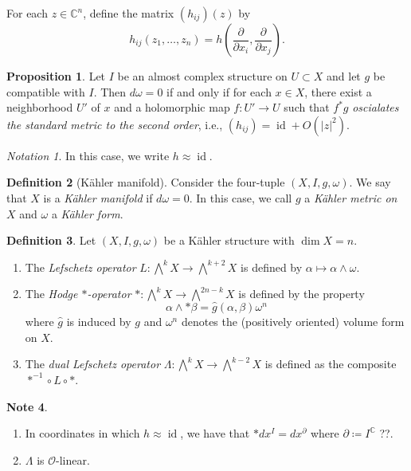 \documentclass[10pt,letterpaper,cm]{nupset}
\theoremstyle{definition}
\newtheorem{defn}{Definition}[subsection]
\newtheorem{note}[defn]{Note}
\theoremstyle{theorem}
\newtheorem{prop}[defn]{Proposition}
\theoremstyle{remark}
\newtheorem*{notation}{Notation}
\newcommand{\C}{\mathbb C}
\renewcommand{\O}{\mathcal O}
\newcommand{\1}{\mathbb{1}}
\newcommand{\0}{\vec 0}
\DeclareMathOperator{\id}{id}
\newcommand{\be}{\begin{enumerate}}
\newcommand{\ee}{\end{enumerate}}
\begin{document}
For each $z\in \C^n$, define the matrix $\left(h_{ij}\right)\left(z\right)$ by $$h_{ij}\left(z_1, \ldots, z_n\right) = h\left(\frac{\partial}{\partial{x_i}}, \frac{\partial}{\partial{x_j}}\right).$$ 

\begin{prop}
Let $I$ be an almost complex structure on $U\subset X$ and let $g$ be compatible with $I$. Then $d{\omega} =0$ if and only if for each $x\in X$, there exist a neighborhood  $U'$ of $x$ and a holomorphic map $f: U' \to U$ such that $f^{\ast}{g}$ \textit{oscialates the standard metric to the second order}, i.e., $\left(h_{ij}\right) = \id + O\left(\lvert{z}\rvert^2\right)$.
\end{prop}

\begin{notation}
In this case, we write $h \approx \id$.
\end{notation}

\begin{defn}[K\"ahler manifold]
Consider the four-tuple $\left(X, I, g, \omega\right)$.  We say that $X$ is a \textit{K\"ahler manifold} if $d{\omega}=0$. In this case, we call $g$ a \textit{K\"ahler metric on $X$} and $\omega$ a \textit{K\"ahler form}.
\end{defn}

\begin{defn}
Let $\left(X, I, g, \omega\right)$ be a K\"ahler structure with $\dim{X} =n$.
\be
\item The \textit{Lefschetz operator} $L: \bigwedge^k{X} \to \bigwedge^{k+2}{X}$ is defined by $\alpha \mapsto \alpha \wedge \omega$.
\item The \textit{Hodge $\ast$-operator} $\ast : \bigwedge^k{X} \to \bigwedge^{2n-k}{X}$  is defined by the property
\[
\alpha \wedge \ast{\beta} = \hat{g}\left(\alpha, \beta\right){\omega^n}
\] where $\hat{g}$ is induced by $g$ and $\omega^n$ denotes the (positively oriented) volume form on $X$.
\item  The \textit{dual Lefschetz operator} $\Lambda : \bigwedge^k{X} \to \bigwedge^{k-2}{X}$ is defined as the composite $\ast^{-1} \circ L\circ \ast$.
\ee
\end{defn}

\begin{note} $ $
\be
\item In coordinates in which $h\approx \id$, we have that $\ast{d{x^I}} = d{x^{\partial}}$ where $\partial \coloneqq I^{\C}$ ??.
\item $\Lambda$ is $\O$-linear.
\ee
\end{note}
\end{document}
